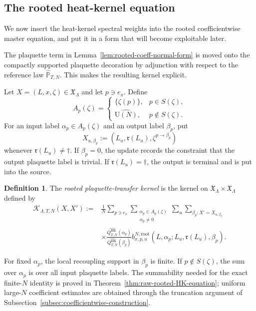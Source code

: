 \documentclass[11pt,a4paper,reqno]{amsart}
\theoremstyle{definition}
\newtheorem{definition}[theorem]{Definition}
\theoremstyle{remark}
\newcommand\U{{\mathrm U}}
\newcommand\HK{{\mathrm{HK}}}
\newcommand\Pbb{{\mathbb{P}}}
\begin{document}
\subsection{The rooted heat-kernel equation}

We now insert the heat-kernel spectral weights into the rooted coefficientwise master equation, and put it in a form that will become exploitable later.

The plaquette term in Lemma~\ref{lem:rooted-coeff-normal-form} is moved onto the compactly supported plaquette decoration by adjunction with respect to the reference law $\widehat\Pbb_{T,N}$. This makes the resulting kernel explicit.

Let $X=(L,x,\zeta)\in\mathfrak X_\Lambda$ and let $p\ni e_x$.  Define
\[
A_p(\zeta)=
\begin{cases}
\{\zeta(p)\},& p\in S(\zeta),\\
\widehat{\U(N)},& p\notin S(\zeta).
\end{cases}
\]
For an input label $\alpha_p\in A_p(\zeta)$ and an output label $\beta_p$, put
\[
X_{u,\beta_p}:=(L_u,\mathfrak r(L_u),\zeta^{p\to\beta_p})
\]
whenever $\mathfrak r(L_u)\ne\dagger$.  If $\beta_p=0$, the update records the constraint that the output plaquette label is trivial.  If $\mathfrak r(L_u)=\dagger$, the output is terminal and is put into the source.

\begin{definition}\label{def:raw-transfer}
The \emph{rooted plaquette-transfer kernel} is the kernel on $\mathfrak X_\Lambda\times\mathfrak X_\Lambda$ defined by
\begin{equation}\label{eq:raw-transfer-kernel}
\begin{aligned}
\mathcal K_{\Lambda,T,N}(X,X')
:={}&\frac1N\sum_{p\ni e_x}
\sum_{\substack{\alpha_p\in A_p(\zeta)\\ \alpha_p\ne0}}
\sum_u\sum_{\beta_p:X'=X_{u,\beta_p}}\\
&\times
\frac{\widehat{Q_{T,N}^\HK}(\alpha_p)}
{\widehat{Q_{T,N}^\HK}(\beta_p)}
 b^{N,\mathrm{root}}_{x,p,u}
 (L,\alpha_p;L_u,\mathfrak r(L_u),\beta_p).
\end{aligned}
\end{equation}
\end{definition}

For fixed $\alpha_p$, the local recoupling support in $\beta_p$ is finite. If $p\notin S(\zeta)$, the sum over $\alpha_p$ is over all input plaquette labels. The summability needed for the exact finite-$N$ identity is proved in Theorem~\ref{thm:raw-rooted-HK-equation}; uniform large-$N$ coefficient estimates are obtained through the truncation argument of Subsection~\ref{subsec:coefficientwise-construction}.
\end{document}
